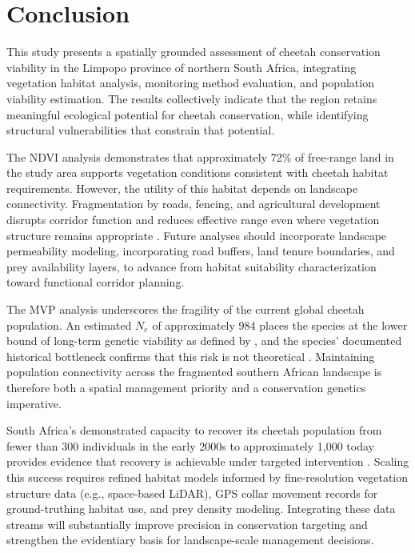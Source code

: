 \documentclass[12pt, letterpaper]{article}
\begin{document}
\section{Conclusion}

This study presents a spatially grounded assessment of cheetah conservation viability in the
Limpopo province of northern South Africa, integrating vegetation habitat analysis, monitoring
method evaluation, and population viability estimation. The results collectively indicate that the
region retains meaningful ecological potential for cheetah conservation, while identifying
structural vulnerabilities that constrain that potential.

The NDVI analysis demonstrates that approximately 72\% of free-range land in the study area
supports vegetation conditions consistent with cheetah habitat requirements. However, the
utility of this habitat depends on landscape connectivity. Fragmentation by roads, fencing, and
agricultural development disrupts corridor function and reduces effective range even where
vegetation structure remains appropriate \citep{Durant2017}. Future analyses should incorporate
landscape permeability modeling, incorporating road buffers, land tenure boundaries, and prey
availability layers, to advance from habitat suitability characterization toward functional
corridor planning.

The MVP analysis underscores the fragility of the current global cheetah population. An
estimated $N_e$ of approximately 984 places the species at the lower bound of long-term
genetic viability as defined by \citet{Frankham2014}, and the species' documented historical
bottleneck confirms that this risk is not theoretical \citep{Durant2017}. Maintaining population
connectivity across the fragmented southern African landscape is therefore both a spatial
management priority and a conservation genetics imperative.

South Africa's demonstrated capacity to recover its cheetah population from fewer than 300
individuals in the early 2000s to approximately 1,000 today provides evidence that recovery is
achievable under targeted intervention \citep{Marnewick2014}. Scaling this success requires
refined habitat models informed by fine-resolution vegetation structure data (e.g., space-based
LiDAR), GPS collar movement records for ground-truthing habitat use, and prey density
modeling. Integrating these data streams will substantially improve precision in conservation
targeting and strengthen the evidentiary basis for landscape-scale management decisions.
\end{document}
